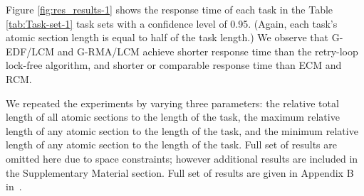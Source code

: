 \documentclass[letter]{sig-alternate}
\begin{document}
Figure \ref{fig:res_results-1} shows the response time of each task in the Table \ref{tab:Task-set-1} task sets with a confidence level of 0.95. (Again, each task's atomic section length is equal to half of the task length.) 
We observe that G-EDF/LCM and G-RMA/LCM achieve shorter 
response time than the retry-loop lock-free
algorithm, and shorter 
or comparable response time than ECM and RCM. 

We repeated the experiments by varying three parameters: the relative total length of all atomic sections to the length of the task, the maximum relative length of any atomic section to the length of the task, and the minimum relative length of any atomic section to the length of the task. Full set of results are omitted here due to space constraints; however additional results are included in the Supplementary Material section. Full set of results are given in Appendix B in~\cite{stmconcurrencycontrol_techreport}.
\end{document}

